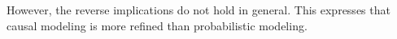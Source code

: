 However, the reverse implications do not hold in general. This expresses that causal modeling is more refined than probabilistic modeling.
